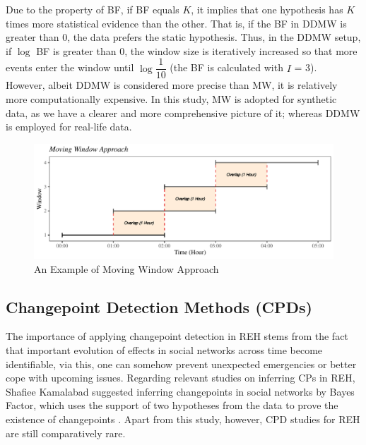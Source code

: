 \documentclass[]{interact}
\theoremstyle{plain}%
\theoremstyle{definition}
\theoremstyle{remark}
\begin{document}
{	Due to the property of BF, if BF equals $K$, it implies that one hypothesis has $K$ times more statistical evidence than the other. That is, if the BF in DDMW is greater than 0, the data prefers the static hypothesis. Thus, in the DDMW setup, if $\log$ BF is greater than 0, the window size is iteratively increased so that more events enter the window until $\log\dfrac{1}{10}$ (the BF is calculated with $I$ = 3). \\
	
	However, albeit DDMW is considered more precise than MW, it is relatively more computationally expensive. In this study, MW is adopted for synthetic data, as we have a clearer and more comprehensive picture of it; whereas DDMW is employed for real-life data. \\
	
	\begin{figure}[h]
		\includegraphics[width=13cm]{MW}
		\centering
		\caption{An Example of Moving Window Approach}
		\label{Figure 2}
	\end{figure}
	
	\subsection{Changepoint Detection Methods (CPDs)}
	
	\hspace{0.2cm} The importance of applying changepoint detection in REH stems from the fact that important evolution of effects in social networks across time become identifiable, via this, one can somehow prevent unexpected emergencies or better cope with upcoming issues. Regarding relevant studies on inferring CPs in REH, Shafiee Kamalabad suggested inferring changepoints in social networks by Bayes Factor, which uses the support of two hypotheses from the data to prove the existence of changepoints \cite{kamalabadWhatPointChange}. Apart from this study, however, CPD studies for REH are still comparatively rare. \\
	
}
\end{document}
